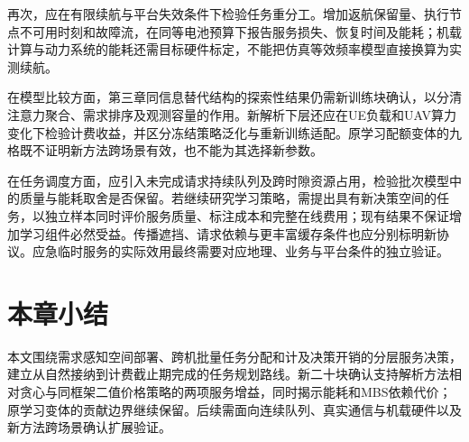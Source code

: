 再次，应在有限续航与平台失效条件下检验任务重分工。增加返航保留量、执行节点不可用时刻和故障流，在同等电池预算下报告服务损失、恢复时间及能耗；机载计算与动力系统的能耗还需目标硬件标定，不能把仿真等效频率模型直接换算为实测续航。

在模型比较方面，第三章同信息替代结构的探索性结果仍需新训练块确认，以分清注意力聚合、需求排序及观测容量的作用。新解析下层还应在UE负载和UAV算力变化下检验计费收益，并区分冻结策略泛化与重新训练适配。原学习配额变体的九格既不证明新方法跨场景有效，也不能为其选择新参数。

在任务调度方面，应引入未完成请求持续队列及跨时隙资源占用，检验批次模型中的质量与能耗取舍是否保留。若继续研究学习策略，需提出具有新决策空间的任务，以独立样本同时评价服务质量、标注成本和完整在线费用；现有结果不保证增加学习组件必然受益。传播遮挡、请求依赖与更丰富缓存条件也应分别标明新协议。应急临时服务的实际效用最终需要对应地理、业务与平台条件的独立验证。

\section{本章小结}
\label{sec:ch6-closing}

本文围绕需求感知空间部署、跨机批量任务分配和计及决策开销的分层服务决策，建立从自然接纳到计费截止期完成的任务规划路线。新二十块确认支持解析方法相对贪心与同框架二值价格策略的两项服务增益，同时揭示能耗和MBS依赖代价；原学习变体的贡献边界继续保留。后续需面向连续队列、真实通信与机载硬件以及新方法跨场景确认扩展验证。
